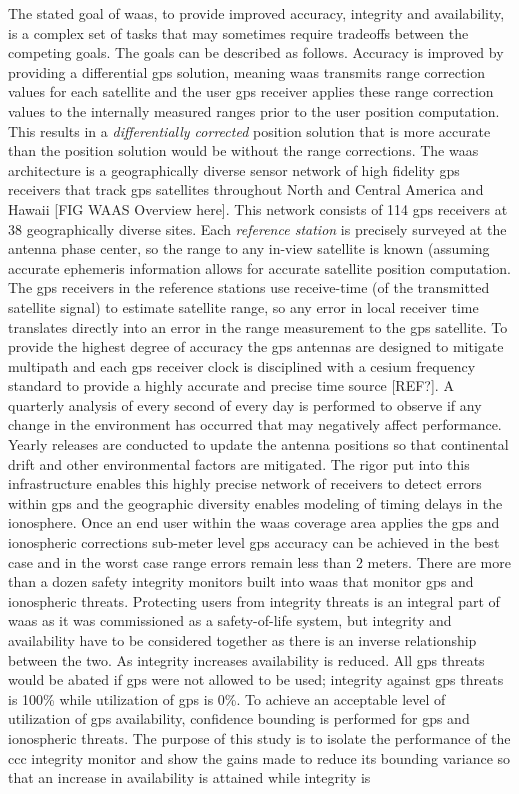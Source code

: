 The stated goal of \ac{waas}, to provide improved accuracy, integrity and availability, is a complex set of tasks that may sometimes require tradeoffs between the competing goals.  The goals can be described as follows.  Accuracy is improved by providing a differential \ac{gps} solution, meaning \ac{waas} transmits range correction values for each satellite and the user \ac{gps} receiver applies these range correction values to the internally measured ranges prior to the user position computation.  This results in a \emph{differentially corrected} position solution that is more accurate than the position solution would be without the range corrections. The \ac{waas} architecture is a geographically diverse sensor network of high fidelity \ac{gps} receivers that track \ac{gps} satellites throughout North and Central America and Hawaii [FIG WAAS Overview here]. This network consists of 114 \ac{gps} receivers at 38 geographically diverse sites.  Each \emph{reference station} is precisely surveyed at the antenna phase center, so the range to any in-view satellite is known (assuming accurate ephemeris information allows for accurate satellite position computation. The \ac{gps} receivers in the reference stations use receive-time (of the transmitted satellite signal) to estimate satellite range, so any error in local receiver time translates directly into an error in the range measurement to the \ac{gps} satellite. To provide the highest degree of accuracy the \ac{gps} antennas are designed to mitigate multipath and each \ac{gps} receiver clock is disciplined with a cesium frequency standard to provide a highly accurate and precise time source [REF?]. A quarterly analysis of every second of every day is performed to observe if any change in the environment has occurred that may negatively affect performance. Yearly releases are conducted to update the antenna positions so that continental drift and other environmental factors are mitigated. The rigor put into this infrastructure enables this highly precise network of receivers to detect errors within \ac{gps} and the geographic diversity enables modeling of timing delays in the ionosphere. Once an end user within the \ac{waas} coverage area applies the \ac{gps} and ionospheric corrections sub-meter level \ac{gps} accuracy can be achieved in the best case and in the worst case range errors remain less than 2 meters. There are more than a dozen safety integrity monitors built into \ac{waas} that monitor \ac{gps} and ionospheric threats. Protecting users from integrity threats is an integral part of \ac{waas} as it was commissioned as a safety-of-life system, but integrity and availability have to be considered together as there is an inverse relationship between the two. As integrity increases availability is reduced. All \ac{gps} threats would be abated if \ac{gps} were not allowed to be used; integrity against \ac{gps} threats is 100\% while utilization of \ac{gps} is 0\%.  To achieve an acceptable level of utilization of \ac{gps} availability, confidence bounding is performed for \ac{gps} and ionospheric threats. The purpose of this study is to isolate the performance of the \ac{ccc} integrity monitor and show the gains made to reduce its bounding variance so that an increase in availability is attained while integrity is 